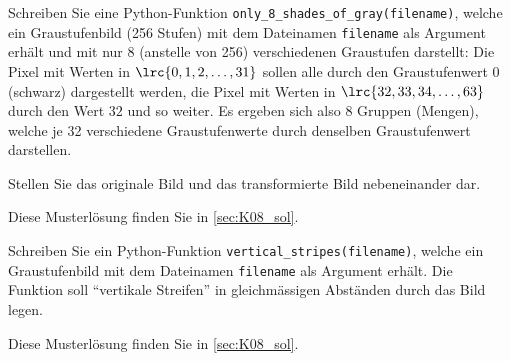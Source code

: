 \begin{myexercise}
	Schreiben Sie eine Python-Funktion \lstinline|only_8_shades_of_gray(filename)|, welche ein Graustufenbild (256 Stufen) mit dem Dateinamen \lstinline|filename| als Argument erhält und mit nur 8 (anstelle von 256) verschiedenen Graustufen darstellt: Die Pixel mit Werten in $\lrc{0, 1, 2, \ldots, 31}$ sollen alle durch den Graustufenwert $0$ (schwarz) dargestellt werden, die Pixel mit Werten in $\lrc{32,33,34,\ldots, 63}$ durch den Wert $32$ und so weiter. Es ergeben sich also 8 Gruppen (Mengen), welche je 32 verschiedene Graustufenwerte durch denselben Graustufenwert darstellen.

	Stellen Sie das originale Bild und das transformierte Bild nebeneinander dar.
	\begin{myanswer}
		Diese Musterlösung finden Sie in \cref{sec:K08_sol}.
	\end{myanswer}
\end{myexercise}

\begin{myexercise}
	Schreiben Sie ein Python-Funktion \lstinline|vertical_stripes(filename)|, welche ein Graustufenbild mit dem Dateinamen \lstinline|filename| als Argument erhält. Die Funktion soll \enquote{vertikale Streifen} in gleichmässigen Abständen durch das Bild legen.
	\begin{myanswer}
		Diese Musterlösung finden Sie in \cref{sec:K08_sol}.
	\end{myanswer}
\end{myexercise}

